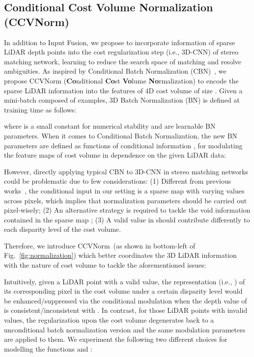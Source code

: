 \documentclass[letterpaper, 10 pt, conference]{ieeeconf}
\newcommand{\modelNameIncatPunc}{Input Fusion}
\newcommand{\modelNameCBN}{CCVNorm }
\newcommand{\modelNameCBNPunc}{CCVNorm}
\newcommand{\figref}{Fig.~\ref}
\begin{document}
{\subsection{Conditional Cost Volume Normalization (\modelNameCBNPunc)}{
\label{ssec:ccvnorm}
In addition to \modelNameIncatPunc, we propose to incorporate information of sparse LiDAR depth points into the cost regularization step (i.e., 3D-CNN) of stereo matching network, learning to reduce the search space of matching and resolve ambiguities. As inspired by Conditional Batch Normalization (CBN)~\cite{cbnlanguage}\cite{cbnreasoning}, we propose \modelNameCBN (\textbf{Co}nditional \textbf{Co}st \textbf{Vo}lume \textbf{No}rmalization) to encode the sparse LiDAR information  into the features of 4D cost volume  of size . Given a mini-batch  composed of  examples, 3D Batch Normalization (BN) is defined at training time as follows:

\noindent where  is a small constant for numerical stability and  are learnable BN parameters. 
When it comes to Conditional Batch Normalization, the new BN parameters  are defined as functions of conditional information , for modulating the feature maps of cost volume in dependence on the given LiDAR data:

However, directly applying typical CBN to 3D-CNN in stereo matching networks could be problematic due to few considerations: (1) Different from previous works~\cite{cbnlanguage}\cite{cbnreasoning}, the conditional input in our setting is a sparse map  with varying values across pixels, which implies that normalization parameters should be carried out pixel-wisely; (2) An alternative strategy is required to tackle the void information contained in the sparse map ; (3) A valid value in  should contribute differently to each disparity level of the cost volume.

Therefore, we introduce \modelNameCBNPunc ~(as shown in bottom-left of \figref{fig:normalization}) which better coordinates the 3D LiDAR information with the nature of cost volume to tackle the aforementioned issues: 

\noindent Intuitively, given a LiDAR point  with a valid value, the representation (i.e., ) of its corresponding pixel in the cost volume under a certain disparity level  would be enhanced/suppressed via the conditional modulation when the depth value of  is consistent/inconsistent with . In contrast, for those LiDAR points with invalid values, the regularization upon the cost volume degenerates back to a unconditional batch normalization version and the same modulation parameters  are applied to them. 
We experiment the following two different choices for modelling the functions  and :

}}
\end{document}
